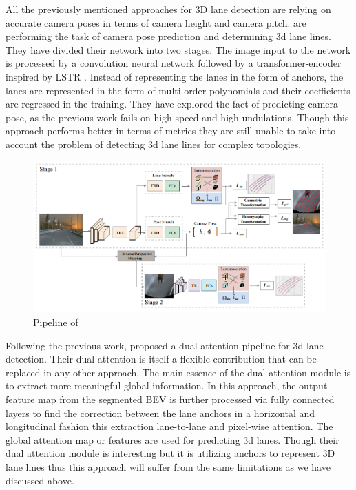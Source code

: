 All the previously mentioned approaches for 3D lane detection are relying on accurate camera poses in terms of camera height and camera pitch. \cite{DBLP:journals/corr/abs-2112-15351} are performing the task of camera pose prediction and determining 3d lane lines. They have divided their network into two stages. The image input to the network is processed by a convolution neural network followed by a transformer-encoder inspired by LSTR \cite{LSTR}. Instead of representing the lanes in the form of anchors, the lanes are represented in the form of multi-order polynomials and their coefficients are regressed in the training. They have explored the fact of predicting camera pose, as the previous work fails on high speed and high undulations. Though this approach performs better in terms of metrics they are still unable to take into account the problem of detecting 3d lane lines for complex topologies. 

 \begin{figure}[h]
    \centering
    \includegraphics[width=\textwidth]{images/3dLane_camera_pose_pipeline.png}
    \caption{Pipeline of \cite{DBLP:journals/corr/abs-2112-15351}}
    \end{figure}

Following the previous work, \cite{9506296} proposed a dual attention pipeline for 3d lane detection. Their dual attention is itself a flexible contribution that can be replaced in any other approach. The main essence of the dual attention module is to extract more meaningful global information. In this approach, the output feature map from the segmented BEV is further processed via fully connected layers to find the correction between the lane anchors in a horizontal and longitudinal fashion this extraction lane-to-lane and pixel-wise attention. The global attention map or features are used for predicting 3d lanes. Though their dual attention module is interesting but it is utilizing anchors to represent 3D lane lines thus this approach will suffer from the same limitations as we have discussed above. 

